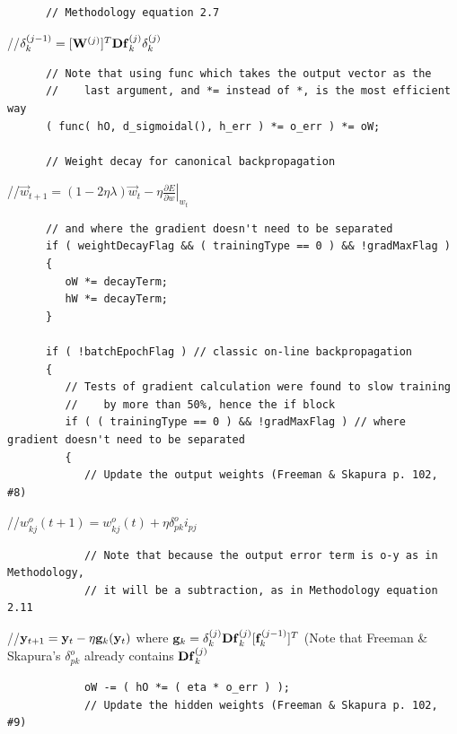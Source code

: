 \documentclass{report}[10pt]
\begin{document}
\begin{verbatim}
      // Methodology equation 2.7
\end{verbatim}
\hspace{24 pt}//\hspace{4 pt}$\delta^{(j-1)}_k =  [{\bf W}^{(j)}]^T {\bf Df}^{(j)}_k \delta^{(j)}_k$
\begin{verbatim}
      // Note that using func which takes the output vector as the
      //    last argument, and *= instead of *, is the most efficient way
      ( func( hO, d_sigmoidal(), h_err ) *= o_err ) *= oW;

      // Weight decay for canonical backpropagation
\end{verbatim}
\hspace{24 pt}//\hspace{4 pt}$\vec w_{t+1} = (1-2\eta\lambda)\vec w_t - \eta \left. \frac{\partial E}{\partial w} \right|_{w_t}$
\begin{verbatim}
      // and where the gradient doesn't need to be separated
      if ( weightDecayFlag && ( trainingType == 0 ) && !gradMaxFlag )
      {
         oW *= decayTerm;
         hW *= decayTerm;
      }

      if ( !batchEpochFlag ) // classic on-line backpropagation
      {
         // Tests of gradient calculation were found to slow training
         //    by more than 50%, hence the if block
         if ( ( trainingType == 0 ) && !gradMaxFlag ) // where gradient doesn't need to be separated
         {
            // Update the output weights (Freeman & Skapura p. 102, #8)
\end{verbatim}
\hspace{48 pt}//\hspace{4 pt}$w^o_{kj}(t+1)=w^o_{kj}(t)+\eta\delta^o_{pk}i_{pj}$
\begin{verbatim}
            // Note that because the output error term is o-y as in Methodology,
            // it will be a subtraction, as in Methodology equation 2.11
\end{verbatim}
\hspace{48 pt}//\hspace{4 pt}${\bf y}_{t+1} = {\bf y}_t - \eta {\bf g}_k({\bf y}_t)$
where ${\bf g}_k = \delta^{(j)}_k{\bf Df}^{(j)}_k[{\bf f}^{(j-1)}_k]^T$
(Note that Freeman \& Skapura's $\delta^o_{pk}$ already contains ${\bf Df}^{(j)}_k$
\begin{verbatim}
            oW -= ( hO *= ( eta * o_err ) );
            // Update the hidden weights (Freeman & Skapura p. 102, #9)
\end{verbatim}
\end{document}
